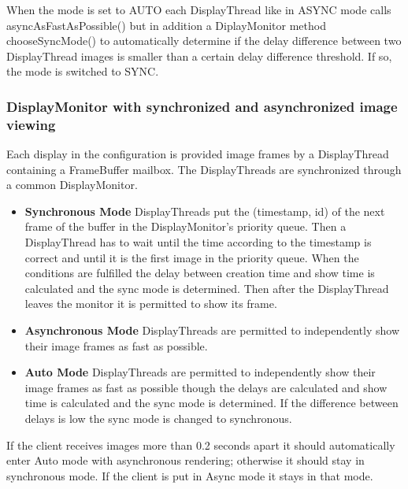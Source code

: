 \documentclass[8pt,titlepage]{article}
\begin{document}
When the mode is set to AUTO each DisplayThread like in ASYNC mode calls asyncAsFastAsPossible() but in addition a DiplayMonitor method chooseSyncMode() to automatically determine if the delay difference between two DisplayThread images is smaller than a certain delay difference threshold. If so, the mode is switched to SYNC.

\subsubsection{DisplayMonitor with synchronized and asynchronized image viewing}
Each display in the configuration is provided image frames by a DisplayThread containing a FrameBuffer mailbox. The DisplayThreads are synchronized through a common DisplayMonitor.

\begin{itemize}
\item \textbf{Synchronous Mode} DisplayThreads put the (timestamp, id) of the next frame of the buffer in the DisplayMonitor’s priority queue. Then a DisplayThread has to wait until the time according to the timestamp is correct and until it is the first image in the priority queue. When the conditions are fulfilled the delay between creation time and show time is calculated and the sync mode is determined. Then after the DisplayThread leaves the monitor it is permitted to show its frame. 	
\item \textbf{Asynchronous Mode} DisplayThreads are permitted to independently show their image frames as fast as possible.
\item \textbf{Auto Mode} DisplayThreads are permitted to independently show their image frames as fast as possible though the delays are calculated and show time is calculated and the sync mode is determined. If the difference between delays is low the sync mode is changed to synchronous.
\end{itemize}

If the client receives images more than 0.2 seconds apart it should automatically enter Auto mode with asynchronous rendering; otherwise it should stay in synchronous mode. If the client is put in Async mode it stays in that mode.
\end{document}
